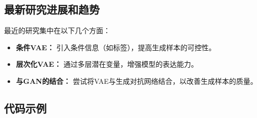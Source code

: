 \subsection*{最新研究进展和趋势}
最近的研究集中在以下几个方面：
\begin{itemize}
    \item \textbf{条件VAE：} 引入条件信息（如标签），提高生成样本的可控性。
    \item \textbf{层次化VAE：} 通过多层潜在变量，增强模型的表达能力。
    \item \textbf{与GAN的结合：} 尝试将VAE与生成对抗网络结合，以改善生成样本的质量。
\end{itemize}
\subsection*{代码示例}
